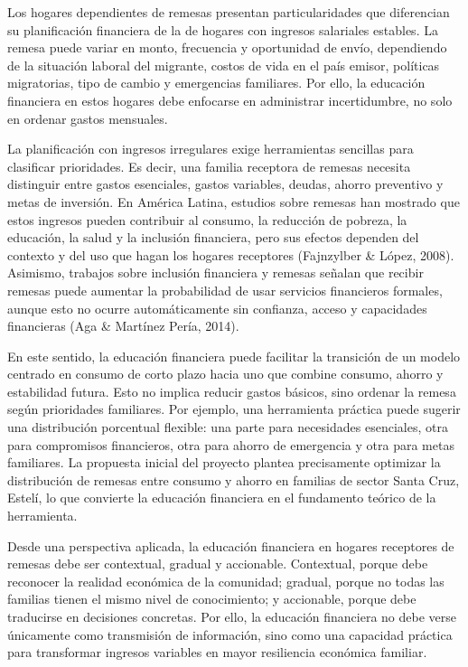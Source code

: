 \documentclass[12pt,letterpaper]{article}
\begin{document}
Los hogares dependientes de remesas presentan particularidades que diferencian su planificación financiera de la de hogares con ingresos salariales estables. La remesa puede variar en monto, frecuencia y oportunidad de envío, dependiendo de la situación laboral del migrante, costos de vida en el país emisor, políticas migratorias, tipo de cambio y emergencias familiares. Por ello, la educación financiera en estos hogares debe enfocarse en administrar incertidumbre, no solo en ordenar gastos mensuales.

La planificación con ingresos irregulares exige herramientas sencillas para clasificar prioridades. Es decir, una familia receptora de remesas necesita distinguir entre gastos esenciales, gastos variables, deudas, ahorro preventivo y metas de inversión. En América Latina, estudios sobre remesas han mostrado que estos ingresos pueden contribuir al consumo, la reducción de pobreza, la educación, la salud y la inclusión financiera, pero sus efectos dependen del contexto y del uso que hagan los hogares receptores (Fajnzylber \& López, 2008). Asimismo, trabajos sobre inclusión financiera y remesas señalan que recibir remesas puede aumentar la probabilidad de usar servicios financieros formales, aunque esto no ocurre automáticamente sin confianza, acceso y capacidades financieras (Aga \& Martínez Pería, 2014).

En este sentido, la educación financiera puede facilitar la transición de un modelo centrado en consumo de corto plazo hacia uno que combine consumo, ahorro y estabilidad futura. Esto no implica reducir gastos básicos, sino ordenar la remesa según prioridades familiares. Por ejemplo, una herramienta práctica puede sugerir una distribución porcentual flexible: una parte para necesidades esenciales, otra para compromisos financieros, otra para ahorro de emergencia y otra para metas familiares. La propuesta inicial del proyecto plantea precisamente optimizar la distribución de remesas entre consumo y ahorro en familias de sector Santa Cruz, Estelí, lo que convierte la educación financiera en el fundamento teórico de la herramienta.

Desde una perspectiva aplicada, la educación financiera en hogares receptores de remesas debe ser contextual, gradual y accionable. Contextual, porque debe reconocer la realidad económica de la comunidad; gradual, porque no todas las familias tienen el mismo nivel de conocimiento; y accionable, porque debe traducirse en decisiones concretas. Por ello, la educación financiera no debe verse únicamente como transmisión de información, sino como una capacidad práctica para transformar ingresos variables en mayor resiliencia económica familiar.
\end{document}
